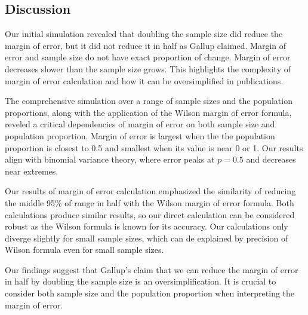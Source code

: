 \documentclass{article}\usepackage[]{graphicx}\usepackage[]{xcolor}
\begin{document}
\begin{multicols}{2}
\section{Discussion}\label{sec:discussion}
Our initial simulation revealed that doubling the sample size did reduce the margin of error, but it did not reduce it in half as Gallup claimed. Margin of error and sample size do not have exact proportion of change. Margin of error decreases slower than the sample size grows. This highlights the complexity of margin of error calculation and how it can be oversimplified in publications.

The comprehensive simulation over a range of sample sizes and the population proportions, along with the application of the Wilson margin of error formula, reveled a critical dependencies of margin of error on both sample size and population proportion. Margin of error is largest when the the population proportion is closest to 0.5 and smallest when its value is near 0 or 1. Our results align with binomial variance theory, where error peaks at $p = 0.5$ and decreases near extremes.

Our results of margin of error calculation emphasized the similarity of reducing the middle 95\% of range in half with the Wilson margin of error formula. Both calculations produce similar results, so our direct calculation can be considered robust as the Wilson formula is known for its accuracy. Our calculations only diverge slightly for small sample sizes, which can de explained by precision of Wilson formula even for small sample sizes.

Our findings suggest that Gallup's claim that we can reduce the margin of error in half by doubling the sample size is an oversimplification. It is crucial to consider both sample size and the population proportion when interpreting the margin of error.

\vspace{2em}


\begin{tiny}

\end{tiny}
\end{multicols}

\newpage
\onecolumn
\end{document}
